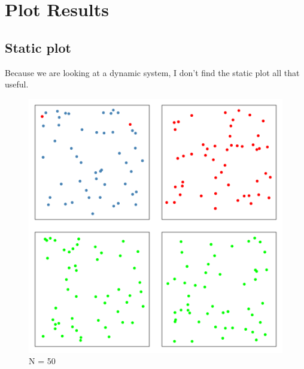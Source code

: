 \documentclass{article}\usepackage[]{graphicx}\usepackage[]{color}
\begin{document}
\section{Plot Results}

\subsection{Static plot}

Because we are looking at a dynamic system, I don't find the static plot all that useful.



\begin{figure}
\includegraphics[width=1\textwidth]{SSModel1.png}
\caption{N = 50}
\end{figure}
\end{document}
